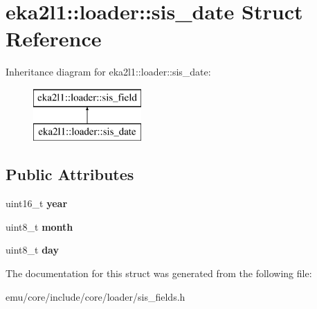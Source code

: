 \hypertarget{structeka2l1_1_1loader_1_1sis__date}{}\section{eka2l1\+:\+:loader\+:\+:sis\+\_\+date Struct Reference}
\label{structeka2l1_1_1loader_1_1sis__date}
Inheritance diagram for eka2l1\+:\+:loader\+:\+:sis\+\_\+date\+:\begin{figure}[H]
\begin{center}
\leavevmode
\includegraphics[height=2.000000cm]{structeka2l1_1_1loader_1_1sis__date}
\end{center}
\end{figure}
\subsection*{Public Attributes}
\begin{DoxyCompactItemize}
\item 
\mbox{\label{structeka2l1_1_1loader_1_1sis__date_a307bfee075aa4f87178f9a6b3093d089}} 
uint16\+\_\+t {\bfseries year}
\item 
\mbox{\label{structeka2l1_1_1loader_1_1sis__date_a374235794c57ccde4907fbeb65ccf46b}} 
uint8\+\_\+t {\bfseries month}
\item 
\mbox{\label{structeka2l1_1_1loader_1_1sis__date_a4e7cf133a82ba3311b3a237f89f07eba}} 
uint8\+\_\+t {\bfseries day}
\end{DoxyCompactItemize}


The documentation for this struct was generated from the following file\+:\begin{DoxyCompactItemize}
\item 
emu/core/include/core/loader/sis\+\_\+fields.\+h\end{DoxyCompactItemize}

